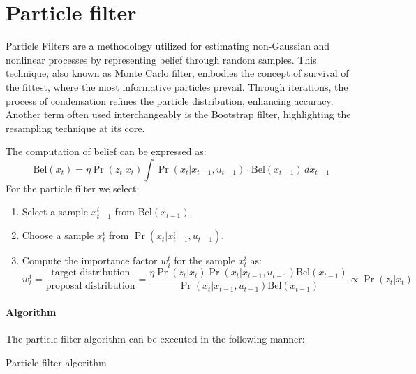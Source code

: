\section{Particle filter}

Particle Filters are a methodology utilized for estimating non-Gaussian and nonlinear processes by representing belief through random samples. 
This technique, also known as Monte Carlo filter, embodies the concept of survival of the fittest, where the most informative particles prevail. 
Through iterations, the process of condensation refines the particle distribution, enhancing accuracy. 
Another term often used interchangeably is the Bootstrap filter, highlighting the resampling technique at its core.

The computation of belief can be expressed as:
\[\text{Bel}(x_t)=\eta\Pr(z_t|x_t)\int\Pr(x_t|x_{t-1},u_{t-1})\cdot\text{Bel}(x_{t-1})\,dx_{t-1}  \]
For the particle filter we select: 
\begin{enumerate}
    \item Select a sample $x^i_{t-1}$ from $\text{Bel}(x_{t-1})$. 
    \item Choose a sample $x^i_t$ from $\Pr(x_t|x_{t-1}^i,u_{t-1})$. 
    \item Compute  the importance factor $w_i^t$ for the sample $x_t^i$ as: 
        \[w_t^i=\dfrac{\text{target distribution}}{\text{proposal distribution}}=\dfrac{\eta\Pr(z_t|x_t)\Pr(x_t|x_{t-1},u_{t-1})\text{Bel}(x_{t-1})}{\Pr(x_t|x_{t-1},u_{t-1})\text{Bel}(x_{t-1})}\propto\Pr(z_t|x_t)\]
\end{enumerate}

\paragraph*{Algorithm}
The particle filter algorithm can be executed in the following manner:
\begin{algorithm}[H]
    \caption{Particle filter algorithm}
        \begin{algorithmic}[1]
            \EndFor
            \EndFor
        \end{algorithmic}
\end{algorithm}

